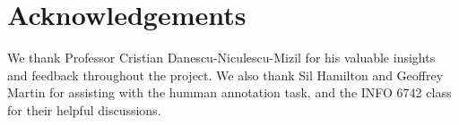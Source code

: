 \section*{Acknowledgements}
We thank Professor Cristian Danescu-Niculescu-Mizil for his valuable insights 
and feedback throughout the project. We also thank Sil Hamilton and 
Geoffrey Martin for assisting with the humman annotation task, and the INFO 6742 
class for their helpful discussions.
